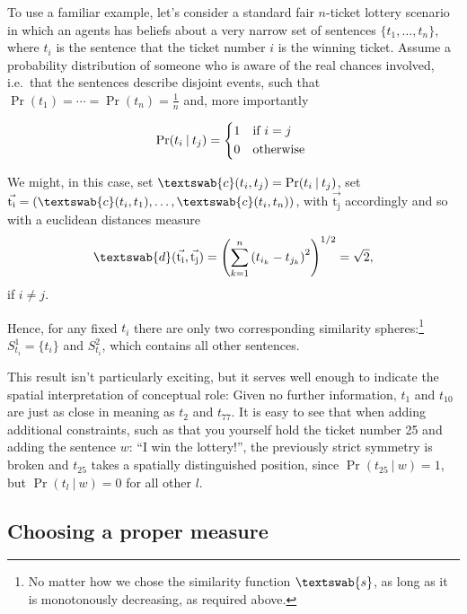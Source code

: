 \documentclass[11pt, a4paper]{scrartcl}
\renewcommand{\v}[1]{\vec{\mathrm{#1}}}
\newcommand{\m}[1]{\textswab{#1}}
\newcommand{\given}[1][]{\:#1\vert\:}
\begin{document}
To use a familiar example, let's consider a standard fair $n$-ticket lottery scenario in which an agents has beliefs about a very narrow set of sentences $\{ t_1, \dots, t_n\}$, where $t_i$ is the sentence that the ticket number $i$ is the winning ticket. Assume a probability distribution of someone who is aware of the real chances involved, i.e.\ that the sentences describe disjoint events, such that $\Pr(t_1) = \cdots = \Pr(t_n) = \frac{1}{n}$ and, more importantly

\[
    \Pr(t_i \given t_j)  =
    \begin{cases*}
        1 & if $i = j$ \\
        0        & otherwise
    \end{cases*}
\]

We might, in this case, set $\m{c}(t_i, t_j) = \Pr(t_i \given t_j)$, set $\v{t_i} = (\m{c}(t_i,t_1),\ldots,\m{c}(t_i,t_n))$, with $\v{t_j}$ accordingly and so with a euclidean distances measure 
\[
    \m{d}(\v{t_i},\v{t_j}) = {\left( \sum_{k=1}^n {(t_{i_k}-t_{j_k})}^2 \right)}^{1/2} = \sqrt{2},  
\]
if $i \not = j$.

Hence, for any fixed $t_i$ there are only two corresponding similarity spheres:\footnote{No matter how we chose the similarity function $\m{s}$, as long as it is monotonously decreasing, as required above.} $S^1_{t_i} = \{ t_i\}$ and $S^2_{t_i}$, which contains all other sentences. 

This result isn't particularly exciting, but it serves well enough to indicate the spatial interpretation of conceptual role: Given no further information, $t_1$ and $t_{10}$ are just as close in meaning as $t_2$ and $t_{77}$. It is easy to see that when adding additional constraints, such as that you yourself hold the ticket number 25 and adding the sentence $w$: ``I win the lottery!'', the previously strict symmetry is broken and $t_{25}$ takes a spatially distinguished position, since $\Pr(t_{25} \given w) = 1$, but $\Pr(t_l \given w) = 0$ for all other $l$. 

\subsection{Choosing a proper measure}\label{sec:choosing}
\end{document}

